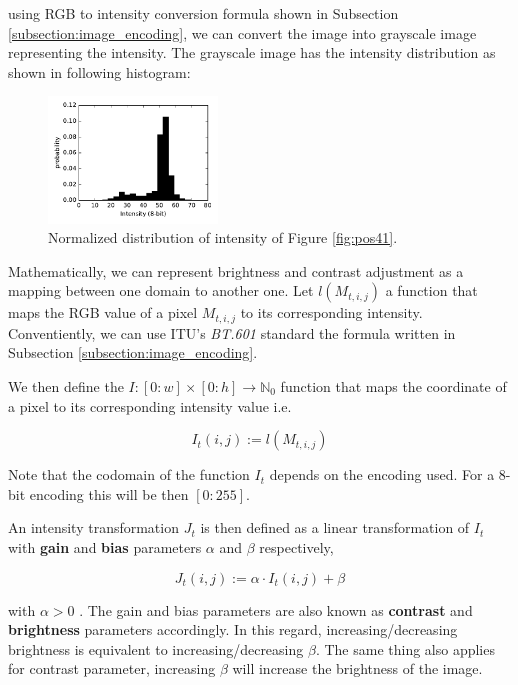 \documentclass[pdftex,12pt,a4paper]{report}
\begin{document}
using RGB to intensity conversion formula shown in Subsection \ref{subsection:image_encoding}, we can convert the image into grayscale image representing the intensity. The grayscale image has the intensity distribution as shown in following histogram:

\begin{figure}[H]
\centering
\includegraphics[width=0.4\textwidth]{images/pos_41_in_t0_hist}
\caption{Normalized distribution of intensity of Figure \ref{fig:pos41}.}
\label{fig:pos41_density}
\end{figure}

Mathematically, we can represent brightness and contrast adjustment as a mapping between one domain to another one. Let $l(M_{t, i, j})$ a function that maps the RGB value of a pixel $M_{t, i, j}$ to its corresponding intensity. Conventiently, we can use ITU's \textit{BT.601} standard the formula written in Subsection \ref{subsection:image_encoding}.

We then define the $I: [0:w] \times [0:h] \rightarrow \mathbb{N}_0$ function that maps the coordinate of a pixel to its corresponding intensity value i.e.

$$
I_t(i, j) := l(M_{t, i, j})
$$

Note that the codomain of the function $I_t$ depends on the encoding used. For a 8-bit encoding this will be then $[0:255]$.

An intensity transformation $J_t$ is then defined as a linear transformation of $I_t$ with \textbf{gain} and \textbf{bias} parameters $\alpha$ and $\beta$ respectively,

\begin{equation}
\label{equation:br_ct_transform}
J_t(i, j) := \alpha \cdot I_t(i, j) + \beta
\end{equation}

with $\alpha > 0$ \cite{szeliski2010computer}. The gain and bias parameters are also known as \textbf{contrast} and \textbf{brightness} parameters accordingly. In this regard, increasing/decreasing brightness is equivalent to increasing/decreasing $\beta$. The same thing also applies for contrast parameter, increasing $\beta$ will increase the brightness of the image.
\end{document}

